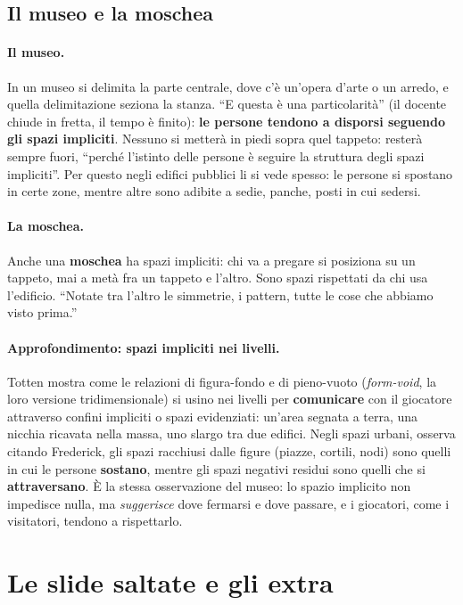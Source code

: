 \subsection{Il museo e la moschea}

\paragraph{Il museo.} In un museo si delimita la parte centrale, dove c'è un'opera d'arte o
un arredo, e quella delimitazione seziona la stanza. ``E questa è una particolarità'' (il
docente chiude in fretta, il tempo è finito): \textbf{le persone tendono a disporsi
seguendo gli spazi impliciti}. Nessuno si metterà in piedi sopra quel tappeto: resterà
sempre fuori, ``perché l'istinto delle persone è seguire la struttura degli spazi
impliciti''. Per questo negli edifici pubblici li si vede spesso: le persone si spostano in
certe zone, mentre altre sono adibite a sedie, panche, posti in cui sedersi.

\paragraph{La moschea.} Anche una \textbf{moschea} ha spazi impliciti: chi va a pregare si
posiziona su un tappeto, mai a metà fra un tappeto e l'altro. Sono spazi rispettati da
chi usa l'edificio. ``Notate tra l'altro le simmetrie, i pattern, tutte le cose che abbiamo
visto prima.''

\paragraph{Approfondimento: spazi impliciti nei livelli.} Totten mostra come le
relazioni di figura-fondo e di pieno-vuoto (\emph{form-void}, la loro versione
tridimensionale) si usino nei livelli per \textbf{comunicare} con il giocatore attraverso
confini impliciti o spazi evidenziati: un'area segnata a terra, una nicchia ricavata nella
massa, uno slargo tra due edifici. Negli spazi urbani, osserva citando Frederick, gli spazi
racchiusi dalle figure (piazze, cortili, nodi) sono quelli in cui le persone
\textbf{sostano}, mentre gli spazi negativi residui sono quelli che si
\textbf{attraversano}. È la stessa osservazione del museo: lo spazio implicito non
impedisce nulla, ma \emph{suggerisce} dove fermarsi e dove passare, e i giocatori, come i
visitatori, tendono a rispettarlo.

\section{Le slide saltate e gli extra}
\label{gd17:sec:extra}

